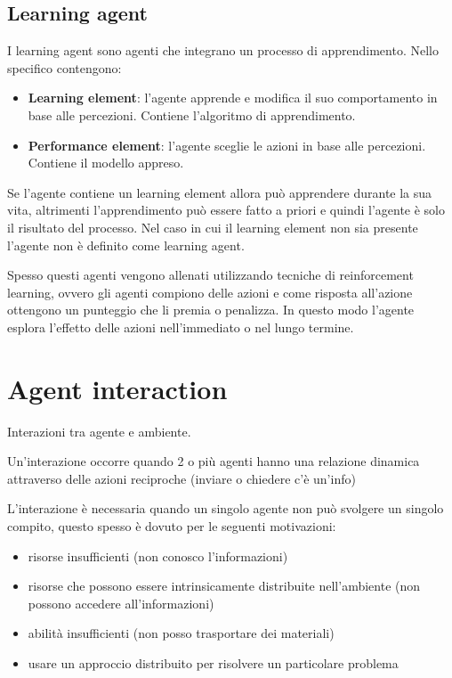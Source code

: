 \subsection{Learning agent}
I learning agent sono agenti che integrano un processo di apprendimento. Nello
specifico contengono:
\begin{itemize}
    \item \textbf{Learning element}: l'agente apprende e modifica il suo comportamento
          in base alle percezioni. Contiene l'algoritmo di apprendimento.
    \item \textbf{Performance element}: l'agente sceglie le azioni in base alle
          percezioni. Contiene il modello appreso.
\end{itemize}

Se l'agente contiene un learning element allora può apprendere durante la sua vita,
altrimenti l'apprendimento può essere fatto a priori e quindi l'agente è solo il
risultato del processo. Nel caso in cui il learning element non sia presente
l'agente non è definito come learning agent.

Spesso questi agenti vengono allenati utilizzando tecniche di reinforcement
learning, ovvero gli agenti compiono delle azioni e come risposta all'azione
ottengono un punteggio che li premia o penalizza. In questo modo l'agente esplora
l'effetto delle azioni nell'immediato o nel lungo termine.

\section{Agent interaction}
Interazioni tra agente e ambiente.
\begin{definizione}
    Un'interazione occorre quando 2 o più agenti hanno una relazione dinamica attraverso delle 
    azioni reciproche (inviare o chiedere c'è un'info)
\end{definizione}
L'interazione è necessaria quando un singolo agente non può svolgere un singolo compito,
questo spesso è dovuto per le seguenti motivazioni:
\begin{itemize}
    \item risorse insufficienti (non conosco l'informazioni)
    \item risorse che possono essere intrinsicamente distribuite nell'ambiente (non possono accedere all'informazioni)
    \item abilità insufficienti (non posso trasportare dei materiali)
    \item usare un approccio distribuito per risolvere un particolare problema
\end{itemize}

